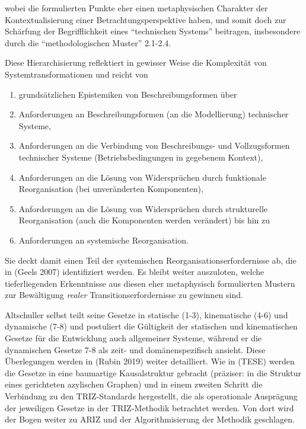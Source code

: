 \documentclass[11pt,a4paper]{article}
\begin{document}
wobei die formulierten Punkte eher einen metaphysischen Charakter der
Kontextualisierung einer Betrachtungsperspektive haben, und somit doch
zur Schärfung der Begrifflichkeit eines ``technischen Systems''
beitragen, insbesondere durch die ``methodologischen Muster'' 2.1-2.4.

Diese Hierarchisierung reflektiert in gewisser Weise die Komplexität von
Systemtransformationen und reicht von

\begin{enumerate}
[noitemsep]
\item
  grundsätzlichen Epistemiken von Beschreibungsformen über
\item
  Anforderungen an Beschreibungsformen (an die Modellierung) technischer
  Systeme,
\item
  Anforderungen an die Verbindung von Beschreibungs- und Vollzugsformen
  technischer Systeme (Betriebsbedingungen in gegebenem Kontext),
\item
  Anforderungen an die Lösung von Widersprüchen durch funktionale
  Reorganisation (bei unveränderten Komponenten),
\item
  Anforderungen an die Lösung von Widersprüchen durch strukturelle
  Reorganisation (auch die Komponenten werden verändert) bis hin zu
\item
  Anforderungen an systemische Reorganisation.
\end{enumerate}

Sie deckt damit einen Teil der systemischen Reorganisationserfordernisse
ab, die in (Geels 2007) identifiziert werden. Es bleibt weiter
auszuloten, welche tieferliegenden Erkenntnisse aus diesen eher
metaphysisch formulierten Mustern zur Bewältigung \emph{realer}
Transitionserfordernisse zu gewinnen sind.

Altschuller selbst teilt seine Gesetze in statische (1-3), kinematische
(4-6) und dynamische (7-8) und postuliert die Gültigkeit der statischen
und kinematischen Gesetze für die Entwicklung auch allgemeiner Systeme,
während er die dynamischen Gesetze 7-8 als zeit- und domänenspezifisch
ansieht. Diese Überlegungen werden in (Rubin 2019) weiter detailliert.
Wie in (TESE) werden die Gesetze in eine baumartige Kausalstruktur
gebracht (präziser: in die Struktur eines gerichteten azylischen
Graphen) und in einem zweiten Schritt die Verbindung zu den
TRIZ-Standards hergestellt, die als operationale Ausprägung der
jeweiligen Gesetze in der TRIZ-Methodik betrachtet werden. Von dort wird
der Bogen weiter zu ARIZ und der Algorithmisierung der Methodik
geschlagen.
\end{document}
